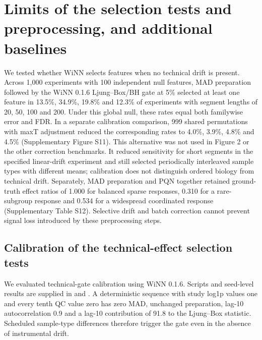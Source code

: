 \documentclass[namedate,webpdf,modern,large,nocrop]{oup-authoring-template}
\begin{document}
\section{Limits of the selection tests and preprocessing, and additional baselines}
\label{sec:supp_targeted_revision}

We tested whether WiNN selects features when no technical drift is present. Across 1,000 experiments with 100 independent null features, MAD preparation followed by the WiNN 0.1.6 Ljung--Box/BH gate at 5\% selected at least one feature in 13.5\%, 34.9\%, 19.8\% and 12.3\% of experiments with segment lengths of 20, 50, 100 and 200. Under this global null, these rates equal both familywise error and FDR. In a separate calibration comparison, 999 shared permutations with maxT adjustment reduced the corresponding rates to 4.0\%, 3.9\%, 4.8\% and 4.5\% (Supplementary Figure S11). This alternative was not used in Figure 2 or the other correction benchmarks. It reduced sensitivity for short segments in the specified linear-drift experiment and still selected periodically interleaved sample types with different means; calibration does not distinguish ordered biology from technical drift. Separately, MAD preparation and PQN together retained ground-truth effect ratios of 1.000 for balanced sparse responses, 0.310 for a rare-subgroup response and 0.534 for a widespread coordinated response (Supplementary Table S12). Selective drift and batch correction cannot prevent signal loss introduced by these preprocessing steps.

\subsection{Calibration of the technical-effect selection tests}

We evaluated technical-gate calibration using WiNN 0.1.6. Scripts and seed-level results are supplied in  and . A deterministic sequence with study log1p values one and every tenth QC value zero has zero MAD, unchanged preparation, lag-10 autocorrelation 0.9 and a lag-10 contribution of 91.8 to the Ljung--Box statistic. Scheduled sample-type differences therefore trigger the gate even in the absence of instrumental drift.
\end{document}

